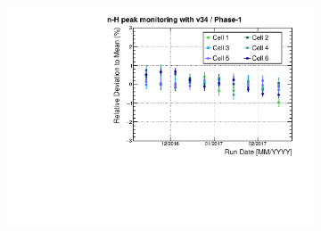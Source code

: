 {\begin{figure}[h!]
\end{figure}


\begin{figure}[h!]
\centering

\begin{subfigure}[b]{0.49\textwidth}
\centering
\includegraphics[width=1\textwidth]{images/Mean_peak_Erec34_nH_250GC_phase-1_fit-crystalball_stacks-10_analysis.pdf}
\caption{}
\label{fig:Mean_peak_Erec34_nH_250GC_phase-1_fit-crystalball_stacks-10_analysis.pdf}
\end{subfigure}



\end{figure}}
